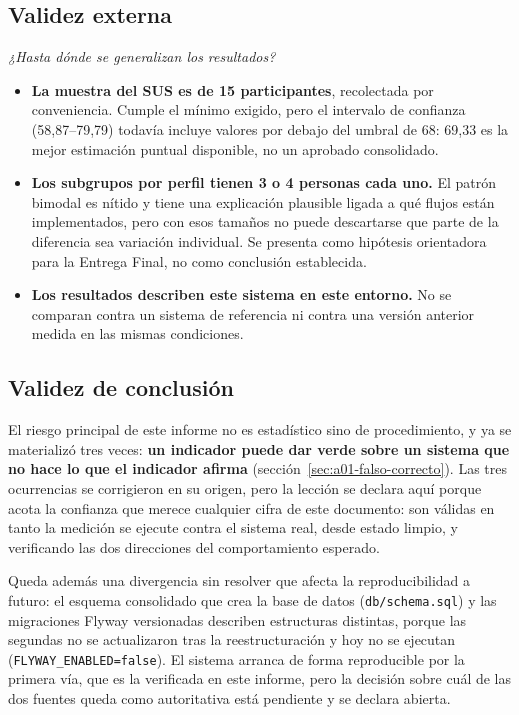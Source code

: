 \documentclass[11pt,a4paper]{article}
\newcommand{\ruta}[1]{\texttt{\footnotesize #1}}
\begin{document}
\subsection{Validez externa}

\emph{¿Hasta dónde se generalizan los resultados?}

\begin{itemize}[leftmargin=*]
  \item \textbf{La muestra del SUS es de 15 participantes},
    recolectada por conveniencia. Cumple el mínimo exigido, pero el
    intervalo de confianza (58,87--79,79) todavía incluye valores por
    debajo del umbral de 68: 69,33 es la mejor estimación puntual
    disponible, no un aprobado consolidado.
  \item \textbf{Los subgrupos por perfil tienen 3 o 4 personas cada uno.}
    El patrón bimodal es nítido y tiene una explicación plausible ligada a
    qué flujos están implementados, pero con esos tamaños no puede
    descartarse que parte de la diferencia sea variación individual. Se
    presenta como hipótesis orientadora para la Entrega Final, no como
    conclusión establecida.
  \item \textbf{Los resultados describen este sistema en este entorno.} No
    se comparan contra un sistema de referencia ni contra una versión
    anterior medida en las mismas condiciones.
\end{itemize}

\subsection{Validez de conclusión}

El riesgo principal de este informe no es estadístico sino de
procedimiento, y ya se materializó tres veces: \textbf{un indicador puede
dar verde sobre un sistema que no hace lo que el indicador afirma}
(sección~\ref{sec:a01-falso-correcto}). Las tres ocurrencias se corrigieron
en su origen, pero la lección se declara aquí porque acota la confianza que
merece cualquier cifra de este documento: son válidas en tanto la medición
se ejecute contra el sistema real, desde estado limpio, y verificando las
dos direcciones del comportamiento esperado.

Queda además una divergencia sin resolver que afecta la reproducibilidad a
futuro: el esquema consolidado que crea la base de datos
(\ruta{db/schema.sql}) y las migraciones Flyway versionadas describen
estructuras distintas, porque las segundas no se actualizaron tras la
reestructuración y hoy no se ejecutan (\texttt{FLYWAY\_ENABLED=false}). El
sistema arranca de forma reproducible por la primera vía, que es la
verificada en este informe, pero la decisión sobre cuál de las dos fuentes
queda como autoritativa está pendiente y se declara abierta.
\end{document}
